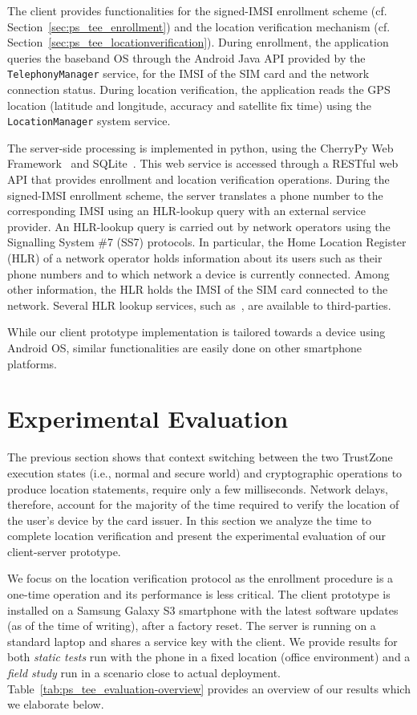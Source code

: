 The client provides functionalities for the signed-IMSI enrollment scheme
(cf. Section~\ref{sec:ps_tee_enrollment}) and the location verification mechanism
(cf. Section~\ref{sec:ps_tee_locationverification}).  During enrollment, the
application queries the baseband OS through the Android Java API provided by the
\texttt{TelephonyManager} service, for the IMSI of the SIM card and the network
connection status. During location verification, the application reads the GPS
location (latitude and longitude, accuracy and satellite fix time) using the
\texttt{LocationManager} system service.

The server-side processing is implemented in python, using the CherryPy Web
Framework~\cite{cherrypy} and SQLite~\cite{sqlite}. This web service is accessed
through a RESTful web API that provides enrollment and location verification
operations. During the signed-IMSI enrollment scheme, the server translates a
phone number to the corresponding IMSI using an HLR-lookup query with an
external service provider. An HLR-lookup query is carried out by network
operators using the Signalling System \#7 (SS7) protocols. In particular, the
Home Location Register (HLR) of a network operator holds information about its
users such as their phone numbers and to which network a device is currently
connected. Among other information, the HLR holds the IMSI of the SIM card
connected to the network. Several HLR lookup services, such as~\cite{hlrlookup},
are available to third-parties.

While our client prototype implementation is tailored towards a device using
Android OS, similar functionalities are easily done on other smartphone
platforms.

\section{Experimental Evaluation}
\label{sec:ps_tee_experimental}

The previous section shows that context switching between the two TrustZone
execution states (i.e., normal and secure world) and cryptographic operations to
produce location statements, require only a few milliseconds.  Network delays,
therefore, account for the majority of the time required to verify the location
of the user's device by the card issuer.  In this section we analyze the time to
complete location verification and present the experimental evaluation of our
client-server prototype.

We focus on the location verification protocol as the enrollment procedure is a
one-time operation and its performance is less critical. The client prototype
is installed on a Samsung Galaxy S3 smartphone with the latest software updates
(as of the time of writing), after a factory reset. The server is running on a
standard laptop and shares a service key with the client. We provide results
for both \emph{static tests} run with the phone in a fixed location (office
environment) and a \emph{field study} run in a scenario close to actual
deployment. Table~\ref{tab:ps_tee_evaluation-overview} provides an overview of
our results which we elaborate below.

